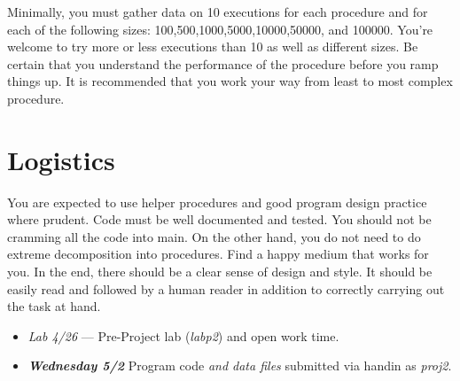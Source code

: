 \documentclass[nobib]{tufte-handout}
\begin{document}
Minimally, you must gather data on 10 executions for each procedure and for each of the following sizes: 100,500,1000,5000,10000,50000, and 100000. You're welcome to try more or less executions than 10 as well as different sizes. Be certain that you understand the performance of the procedure before you ramp things up. It is recommended that you work your way from least to most complex procedure.



\section{Logistics}

You are expected to use helper procedures and good program design practice where prudent. Code must be well documented and tested. You should not be cramming all the code into main. On the other hand, you do not need to do extreme decomposition into procedures.  Find a happy medium that works for you. In the end, there should be a clear sense of design and style. It should be easily read and followed by a human reader in addition to correctly carrying out the task at hand.

\begin{itemize}
\item \textit{Lab 4/26} --- Pre-Project lab (\textit{labp2}) and open work time.
\item \textit{\textbf{Wednesday 5/2}} Program code \textit{and data files} submitted via handin as \textit{proj2}.
\end{itemize}
\end{document}
